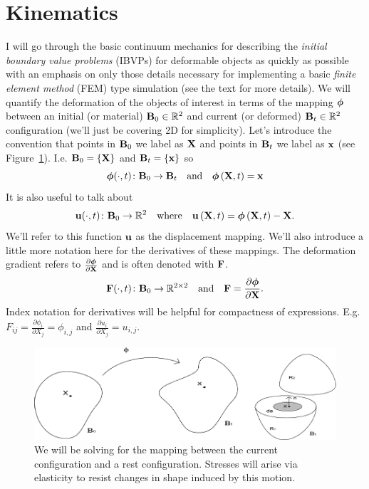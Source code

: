 
\section*{Kinematics}

I will go through the basic continuum mechanics for describing the \emph{initial boundary value problems} (IBVPs) for deformable objects as quickly as possible with an emphasis on only those details necessary for implementing a basic \emph{finite element method} (FEM) type simulation (see the text \cite{Bonet_Wood_2008} for more details). We will quantify the deformation of the objects of interest in terms of the mapping $\boldsymbol{\phi}$ between an initial (or material) $\mathbf{B}_0 \in \mathbb{R}^2$ and current (or deformed) $\mathbf{B}_t \in \mathbb{R}^2$ configuration (we'll just be covering 2D for simplicity). Let's introduce the convention that points in $\mathbf{B}_0$ we label as $\mathbf{X}$ and points in $\mathbf{B}_t$ we label as $\mathbf{x}$ (see Figure~\ref{fig:phi}). I.e. $\mathbf{B}_0 = \left\{ \mathbf{X} \right\}$ and $\mathbf{B}_t = \left\{ \mathbf{x} \right\}$ so
\begin{equation*}
\boldsymbol{\phi}(\cdot,t) \colon \mathbf{B}_0 \to \mathbf{B}_t \quad \text{and} \quad \boldsymbol{\phi} \left( \mathbf{X}, t \right) = \mathbf{x}
\end{equation*}
It is also useful to talk about
\begin{equation*}
\mathbf{u}(\cdot,t) \colon \mathbf{B}_0 \to \mathbb{R}^2 \quad \text{where} \quad \mathbf{u} \left( \mathbf{X}, t \right) = \boldsymbol{\phi} \left( \mathbf{X}, t \right) - \mathbf{X}.
\end{equation*}
We'll refer to this function $\mathbf{u}$ as the displacement mapping. We'll also introduce a little more notation here for the derivatives of these mappings. The deformation gradient refers to $\frac{\partial\boldsymbol{\phi}}{\partial\mathbf{X}}$ and is often denoted with $\mathbf{F}$.
\begin{equation*}
\mathbf{F}(\cdot,t) \colon \mathbf{B}_0 \to \mathbb{R}^{2\times2} \quad \text{and} \quad \mathbf{F} = \frac{\partial\boldsymbol{\phi}}{\partial\mathbf{X}}.
\end{equation*}
Index notation for derivatives will be helpful for compactness of expressions. E.g. $F_{ij} = \frac{\partial\phi_i}{\partial X_j} = \phi_{i,j}$ and $\frac{\partial u_i}{\partial X_j} = u_{i,j}$.
\begin{figure}
\includegraphics[width=\columnwidth]{images/continuum}
\caption{We will be solving for the mapping between the current configuration and a rest configuration. Stresses will arise via elasticity to resist changes in shape induced by this motion.}
\label{fig:phi}
\end{figure}

